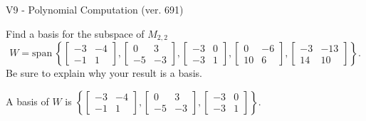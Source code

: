 \begin{exercise}
  \begin{exerciseTitle}V9 - Polynomial Computation (ver. 691)\end{exerciseTitle}
  \begin{exerciseStatement}
    Find a basis for the subspace of \(M_{2,2}\) 
\[W=\mathrm{span}\ \left\{\left[\begin{array}{cc}
-3 & -4 \\
-1 & 1
\end{array}\right] , \left[\begin{array}{cc}
0 & 3 \\
-5 & -3
\end{array}\right] , \left[\begin{array}{cc}
-3 & 0 \\
-3 & 1
\end{array}\right] , \left[\begin{array}{cc}
0 & -6 \\
10 & 6
\end{array}\right] , \left[\begin{array}{cc}
-3 & -13 \\
14 & 10
\end{array}\right]\right\}.\]
 Be sure to explain why your result is a basis.


  \end{exerciseStatement}
  \begin{exerciseAnswer}
   A basis of \(W\) is  \(\left\{\left[\begin{array}{cc}
-3 & -4 \\
-1 & 1
\end{array}\right] , \left[\begin{array}{cc}
0 & 3 \\
-5 & -3
\end{array}\right] , \left[\begin{array}{cc}
-3 & 0 \\
-3 & 1
\end{array}\right]\right\}\).
  


  \end{exerciseAnswer}
\end{exercise}